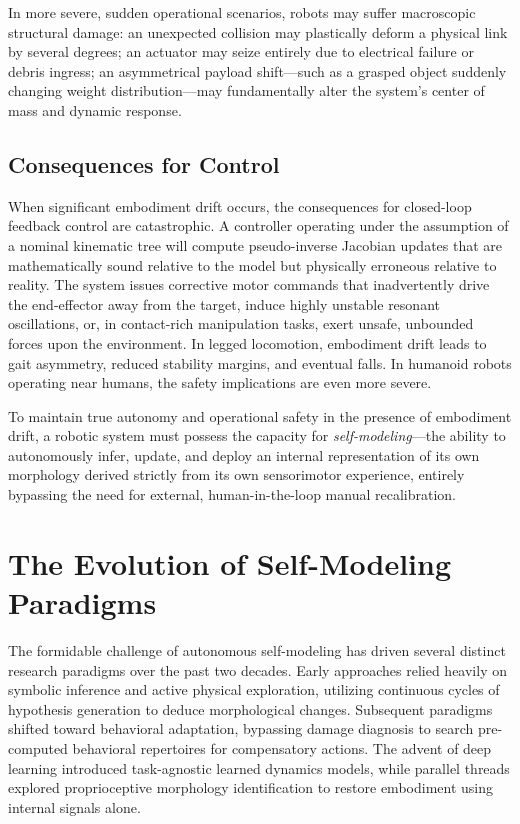 \documentclass[12pt,a4paper,oneside]{report}
\begin{document}
In more severe, sudden operational scenarios, robots may suffer macroscopic structural damage: an unexpected collision may plastically deform a physical link by several degrees; an actuator may seize entirely due to electrical failure or debris ingress; an asymmetrical payload shift---such as a grasped object suddenly changing weight distribution---may fundamentally alter the system's center of mass and dynamic response.

\subsection{Consequences for Control}
\label{subsec:consequences_control}

When significant embodiment drift occurs, the consequences for closed-loop feedback control are catastrophic. A controller operating under the assumption of a nominal kinematic tree will compute pseudo-inverse Jacobian updates that are mathematically sound relative to the model but physically erroneous relative to reality. The system issues corrective motor commands that inadvertently drive the end-effector away from the target, induce highly unstable resonant oscillations, or, in contact-rich manipulation tasks, exert unsafe, unbounded forces upon the environment. In legged locomotion, embodiment drift leads to gait asymmetry, reduced stability margins, and eventual falls. In humanoid robots operating near humans, the safety implications are even more severe.

To maintain true autonomy and operational safety in the presence of embodiment drift, a robotic system must possess the capacity for \textit{self-modeling}---the ability to autonomously infer, update, and deploy an internal representation of its own morphology derived strictly from its own sensorimotor experience, entirely bypassing the need for external, human-in-the-loop manual recalibration.



\section{The Evolution of Self-Modeling Paradigms}
\label{sec:evolution_self_modeling}

The formidable challenge of autonomous self-modeling has driven several distinct research paradigms over the past two decades. Early approaches relied heavily on symbolic inference and active physical exploration, utilizing continuous cycles of hypothesis generation to deduce morphological changes. Subsequent paradigms shifted toward behavioral adaptation, bypassing damage diagnosis to search pre-computed behavioral repertoires for compensatory actions. The advent of deep learning introduced task-agnostic learned dynamics models, while parallel threads explored proprioceptive morphology identification to restore embodiment using internal signals alone.
\end{document}

